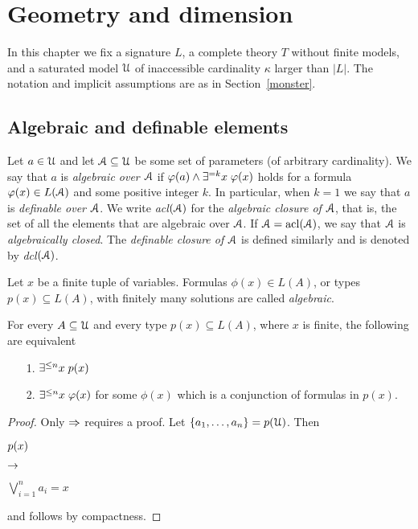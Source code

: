 \chapter{Geometry and dimension}\label{geometria}

\def\medrel#1{\parbox[t]{5ex}{$\displaystyle\hfil #1$}}
\def\ceq#1#2#3{\parbox{35ex}{$\displaystyle #1$}\medrel{#2}$\displaystyle  #3$}

In this chapter we fix a signature $L$, a complete theory $T$ without finite models, and a saturated model $\EuScript U$ of inaccessible cardinality $\kappa$ larger than $|L|$.
The notation and implicit assumptions are as in Section~\ref{monster}.

\section{Algebraic and definable elements}\label{acl}

Let $a\in\EuScript U$ and let $\EuScript A\subseteq\EuScript U$ be some set of parameters (of arbitrary cardinality).
We say that $a$ is \emph{algebraic over $\EuScript A$\/} if $\varphi(a)\wedge\exists^{=k}x\;\varphi(x)$ holds for a formula $\varphi(x)\in L(\EuScript A)$ and  some positive integer $k$.
In particular, when $k=1$ we say that $a$ is \emph{definable over $\EuScript A$}.
We write \emph{acl$(\EuScript A)$} for the \emph{algebraic closure of $\EuScript A$}, that is, the set of all the elements that are algebraic over $\EuScript A$.
If $\EuScript A={\rm acl}(\EuScript A)$, we say that $\EuScript A$ is \emph{algebraically closed}.
The \emph{definable closure of $\EuScript A$\/} is defined similarly and is denoted by \emph{dcl$(\EuScript A)$}.

Let $x$ be a finite tuple of variables.
Formulas $\phi(x)\in L(A)$, or types $p(x)\subseteq L(A)$, with finitely many solutions are called \emph{algebraic}.

\begin{proposition}\label{prop_tipialgebrici}
For every $A\subseteq\EuScript U$ and every type $p(x)\subseteq L(A)$, where $x$ is finite, the following are equivalent
\begin{itemize} 
\item[1.] $\exists^{\le n}x\; p(x)$
\item[2.] $\exists^{\le n}x\;\varphi(x)$ for some $\phi(x)$ which is a conjunction of formulas in $p(x)$.
\end{itemize}
\end{proposition}
\begin{proof} Only $\Rightarrow$ requires a proof.
Let $\{a_1,\dots,a_n\}=p(\EuScript U)$.
Then 

\ceq{\hfill p(x)}{\imp}{\bigvee^n_{i=1}a_i=x}

and  follows by compactness.
\end{proof}

